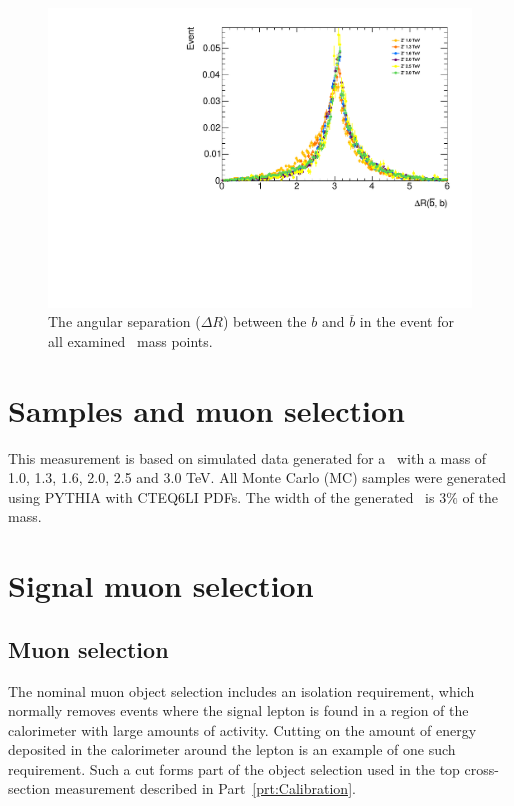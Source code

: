 \begin{figure}[t]
\includegraphics[width=\textwidth]{PartBoosted/Plots/h_b_bbar_dr.pdf}
\caption{The angular separation ($\Delta R$) between the $b$ and $\overline{b}$ in the event for all examined \Zprime\ mass points.} \label{fig:ExampleBackToBack}
\end{figure}

\section{Samples and muon selection}

This measurement is based on simulated data generated for a \Zprime\ with a mass of 1.0, 1.3, 1.6, 2.0, 2.5 and 3.0 TeV. All Monte Carlo (MC) samples were generated using \textsc{PYTHIA} with CTEQ6LI PDFs. The width of the generated \Zprime\ is $3\%$ of the mass. 

\section{Signal muon selection}

\subsection{Muon selection}
The nominal muon object selection includes an isolation requirement, which normally removes events where the signal lepton is found in a region of the calorimeter with large amounts of activity. Cutting on the amount of energy deposited in the calorimeter around the lepton is an example of one such requirement. Such a cut forms part of the object selection used in the top cross-section measurement described in Part~\ref{prt:Calibration}.

